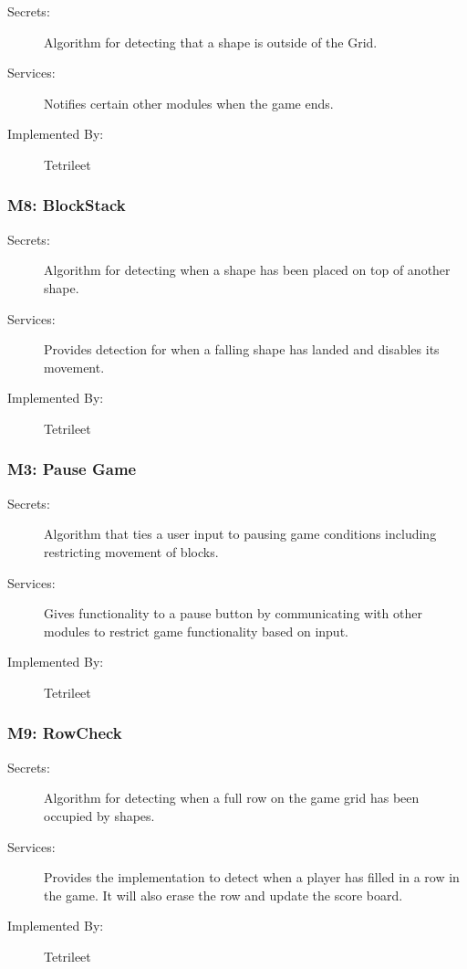 \documentclass[12pt, titlepage]{article}
\begin{document}
\begin{description}
\item[Secrets:] Algorithm for detecting that a shape is outside of the Grid.
\item[Services:] Notifies certain other modules when the game ends.
\item[Implemented By:] Tetrileet
\end{description}

\subsubsection{M8: BlockStack}

\begin{description}
\item[Secrets:] Algorithm for detecting when a shape has been placed on top of another shape.
\item[Services:]Provides detection for when a falling shape has landed and disables its movement.
\item[Implemented By:] Tetrileet
\end{description}

\subsubsection{M3: Pause Game}

\begin{description}
\item[Secrets:]Algorithm that ties a user input to pausing game conditions including restricting movement of blocks. 
\item[Services:] Gives functionality to a pause button by communicating with other modules to restrict game functionality based on input.
\item[Implemented By:] Tetrileet
\end{description}

\subsubsection{M9: RowCheck}

\begin{description}
\item[Secrets:]Algorithm for detecting when a full row on the game grid has been occupied by shapes.
\item[Services:] Provides the implementation to detect when a player has filled in a row in the game. It will also erase the row and update the score board.
\item[Implemented By:] Tetrileet 
\end{description}
\end{document}
